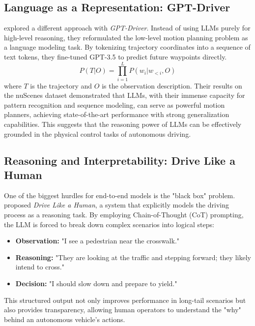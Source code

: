 \documentclass[12pt, a4paper]{article}
\begin{document}
\subsection{Language as a Representation: GPT-Driver}
\cite{mao2023gpt} explored a different approach with \textit{GPT-Driver}. Instead of using LLMs purely for high-level reasoning, they reformulated the low-level motion planning problem as a language modeling task. By tokenizing trajectory coordinates into a sequence of text tokens, they fine-tuned GPT-3.5 to predict future waypoints directly.
\begin{equation}
    P(T | O) = \prod_{i=1}^{L} P(w_i | w_{<i}, O)
\end{equation}
where $T$ is the trajectory and $O$ is the observation description. Their results on the nuScenes dataset demonstrated that LLMs, with their immense capacity for pattern recognition and sequence modeling, can serve as powerful motion planners, achieving state-of-the-art performance with strong generalization capabilities. This suggests that the reasoning power of LLMs can be effectively grounded in the physical control tasks of autonomous driving.

\subsection{Reasoning and Interpretability: Drive Like a Human}
One of the biggest hurdles for end-to-end models is the "black box" problem. \cite{fu2023drive} proposed \textit{Drive Like a Human}, a system that explicitly models the driving process as a reasoning task. By employing Chain-of-Thought (CoT) prompting, the LLM is forced to break down complex scenarios into logical steps:
\begin{itemize}
    \item \textbf{Observation:} "I see a pedestrian near the crosswalk."
    \item \textbf{Reasoning:} "They are looking at the traffic and stepping forward; they likely intend to cross."
    \item \textbf{Decision:} "I should slow down and prepare to yield."
\end{itemize}
This structured output not only improves performance in long-tail scenarios but also provides transparency, allowing human operators to understand the "why" behind an autonomous vehicle's actions.
\end{document}
